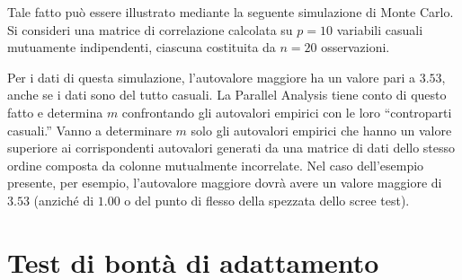 \documentclass[
  11pt,
]{krantz}
\makeatletter
\newenvironment{Shaded}{\begin{snugshade}}{\end{snugshade}}
\newcommand{\CommentTok}[1]{\textcolor[rgb]{0.37,0.37,0.37}{\textit{#1}}}
\newcommand{\ControlFlowTok}[1]{\textcolor[rgb]{0.27,0.27,0.27}{\textbf{#1}}}
\newcommand{\DecValTok}[1]{\textcolor[rgb]{0.06,0.06,0.06}{#1}}
\newcommand{\FunctionTok}[1]{\textcolor[rgb]{0,0,0}{#1}}
\newcommand{\NormalTok}[1]{#1}
\newcommand{\OtherTok}[1]{\textcolor[rgb]{0.37,0.37,0.37}{#1}}
\newcommand{\SpecialCharTok}[1]{\textcolor[rgb]{0,0,0}{#1}}
\newenvironment{kframe}{%
\medskip{}
\setlength{\fboxsep}{.8em}
 \def\at@end@of@kframe{}%
 \ifinner\ifhmode%
  \def\at@end@of@kframe{\end{minipage}}%
  \begin{minipage}{\columnwidth}%
 \fi\fi%
 \def\FrameCommand##1{\hskip\@totalleftmargin \hskip-\fboxsep
 \colorbox{shadecolor}{##1}\hskip-\fboxsep
     \hskip-\linewidth \hskip-\@totalleftmargin \hskip\columnwidth}%
 \MakeFramed {\advance\hsize-\width
   \@totalleftmargin\z@ \linewidth\hsize
   \@setminipage}}%
 {\par\unskip\endMakeFramed%
 \at@end@of@kframe}
\renewenvironment{Shaded}{\begin{kframe}}{\end{kframe}}
\theoremstyle{definition}
\theoremstyle{definition}
\theoremstyle{definition}
\theoremstyle{definition}
\theoremstyle{remark}
\makeatother
\begin{document}
Tale fatto può essere illustrato mediante la seguente simulazione di Monte Carlo. Si consideri una matrice di correlazione calcolata su \(p=10\) variabili casuali mutuamente indipendenti, ciascuna costituita da \(n=20\) osservazioni.

\begin{Shaded}
\end{Shaded}

Per i dati di questa simulazione, l'autovalore maggiore ha un valore pari a \(3.53\), anche se i dati sono del tutto casuali. La Parallel Analysis tiene conto di questo fatto e determina \(m\) confrontando gli autovalori empirici con le loro ``controparti casuali.'' Vanno a determinare \(m\) solo gli autovalori empirici che hanno un valore superiore ai corrispondenti autovalori generati da una matrice di dati dello stesso ordine composta da colonne mutualmente incorrelate. Nel caso dell'esempio presente, per esempio, l'autovalore maggiore dovrà avere un valore maggiore di \(3.53\) (anziché di \(1.00\) o del punto di flesso della spezzata dello scree test).

\hypertarget{test-di-bontuxe0-di-adattamento}{%
\section{Test di bontà di adattamento}\label{test-di-bontuxe0-di-adattamento}}
\end{document}
